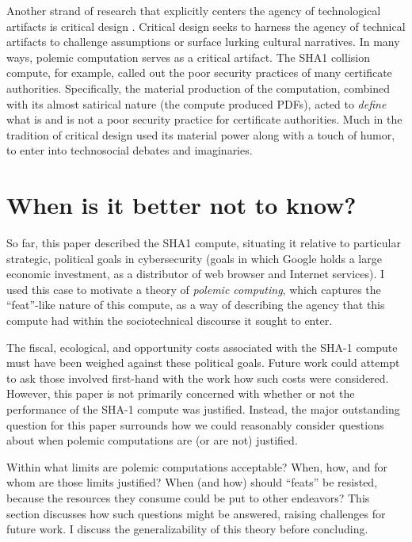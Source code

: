 \documentclass[sigconf]{acmart}
\begin{document}
Another strand of research that explicitly centers the agency of technological artifacts
is critical design \cite{Dunne2001}.
Critical design seeks to harness the agency of technical artifacts 
to challenge assumptions or surface lurking cultural narratives.
In many ways, polemic computation serves as a critical artifact.
The SHA1 collision compute, for example, 
called out the poor security practices of many certificate authorities.
Specifically, the material production of the computation,
combined with its almost satirical nature (the compute produced PDFs),
acted to \emph{define} what is and is not a poor security practice for certificate authorities.
Much in the tradition of critical design
used its material power \cite{Bennett2013a} along with a touch of humor, to enter into technosocial debates and imaginaries.

\section{When is it better not to know?}
\label{sec:orge733797}

So far, this paper described the SHA1 compute, situating it relative to particular strategic, political goals in cybersecurity (goals in which Google holds a large economic investment, as a distributor of web browser and Internet services).
I used this case to motivate a theory of \emph{polemic computing}, which captures the ``feat''-like nature of this compute, as a way of describing the agency that this compute had within the sociotechnical discourse it sought to enter.

The fiscal, ecological, and opportunity costs associated with the SHA-1 compute must have been weighed against these political goals. Future work could attempt to ask those involved first-hand with the work how such costs were considered.
However, this paper is not primarily concerned with whether or not the performance of the SHA-1 compute was justified. 
Instead, the major outstanding question for this paper surrounds how we could reasonably consider questions about when polemic computations are (or are not) justified.

Within what limits are polemic computations acceptable?
When, how, and for whom are those limits justified? 
When (and how) should ``feats'' be resisted, because the resources they consume could be put to other endeavors? 
This section discusses how such questions might be answered, raising challenges for future work. 
I discuss the generalizability of this theory before concluding.
\end{document}
